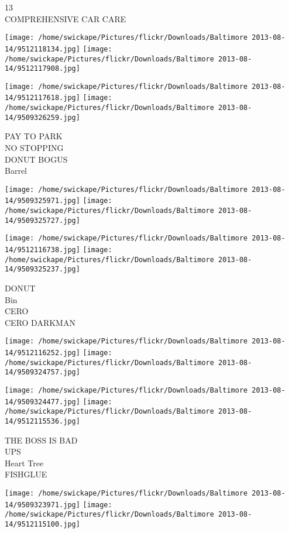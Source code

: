 \documentclass[10pt,letterpaper]{article}
\begin{document}
13\\
COMPREHENSIVE CAR CARE
\pagebreak

\texttt{[image: /home/swickape/Pictures/flickr/Downloads/Baltimore 2013-08-14/9512118134.jpg]}
\texttt{[image: /home/swickape/Pictures/flickr/Downloads/Baltimore 2013-08-14/9512117908.jpg]}

\texttt{[image: /home/swickape/Pictures/flickr/Downloads/Baltimore 2013-08-14/9512117618.jpg]}
\texttt{[image: /home/swickape/Pictures/flickr/Downloads/Baltimore 2013-08-14/9509326259.jpg]}

PAY TO PARK\\
NO STOPPING\\
DONUT BOGUS\\
Barrel
\pagebreak

\texttt{[image: /home/swickape/Pictures/flickr/Downloads/Baltimore 2013-08-14/9509325971.jpg]}
\texttt{[image: /home/swickape/Pictures/flickr/Downloads/Baltimore 2013-08-14/9509325727.jpg]}

\texttt{[image: /home/swickape/Pictures/flickr/Downloads/Baltimore 2013-08-14/9512116738.jpg]}
\texttt{[image: /home/swickape/Pictures/flickr/Downloads/Baltimore 2013-08-14/9509325237.jpg]}

DONUT\\
Bin\\
CERO\\
CERO DARKMAN
\pagebreak

\texttt{[image: /home/swickape/Pictures/flickr/Downloads/Baltimore 2013-08-14/9512116252.jpg]}
\texttt{[image: /home/swickape/Pictures/flickr/Downloads/Baltimore 2013-08-14/9509324757.jpg]}

\texttt{[image: /home/swickape/Pictures/flickr/Downloads/Baltimore 2013-08-14/9509324477.jpg]}
\texttt{[image: /home/swickape/Pictures/flickr/Downloads/Baltimore 2013-08-14/9512115536.jpg]}

THE BOSS IS BAD\\
UPS\\
Heart Tree\\
FISHGLUE
\pagebreak

\texttt{[image: /home/swickape/Pictures/flickr/Downloads/Baltimore 2013-08-14/9509323971.jpg]}
\texttt{[image: /home/swickape/Pictures/flickr/Downloads/Baltimore 2013-08-14/9512115100.jpg]}
\end{document}
